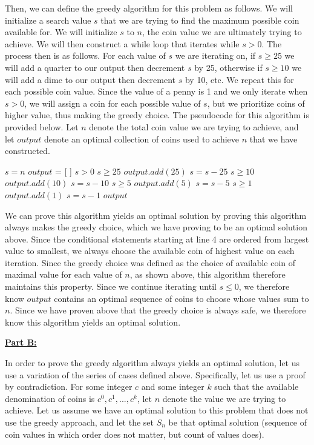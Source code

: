 \documentclass[11pt]{article}
\begin{document}
Then, we can define the greedy algorithm for this problem as follows. We will initialize a search value $s$ that we are trying to find the maximum possible coin available for. We will initialize $s$ to $n$, the coin value we are ultimately trying to achieve. We will then construct a while loop that iterates while $s>0$. The process then is as follows. For each value of $s$ we are iterating on, if $s \geq 25$ we will add a quarter to our output then decrement $s$ by 25, otherwise if $s \geq 10$ we will add a dime to our output then decrement $s$ by 10, etc. We repeat this for each possible coin value. Since the value of a penny is 1 and we only iterate when $s > 0$, we will assign a coin for each possible value of $s$, but we prioritize coins of higher value, thus making the greedy choice. The pseudocode for this algorithm is provided below. Let $n$ denote the total coin value we are trying to achieve, and let $output$ denote an optimal collection of coins used to achieve $n$ that we have constructed.

\begin{codebox}
\li $s = n$
\li $output$ = [ ]
\li \While $s > 0$ \Do
\li     \If $s \geq 25$ \Then
\li         $output.add(25)$
\li         $s = s - 25$
\li     \ElseIf $s \geq 10$ \Then
\li         $output.add(10)$
\li         $s = s - 10$
\li     \ElseIf $s \geq 5$ \Then
\li         $output.add(5)$
\li         $s = s - 5$
\li     \ElseIf $s \geq 1$ \Then
\li         $output.add(1)$
\li         $s = s - 1$
        \End
\li \End
\li \Return $output$
\end{codebox}

We can prove this algorithm yields an optimal solution by proving this algorithm always makes the greedy choice, which we have proving to be an optimal solution above. Since the conditional statements starting at line 4 are ordered from largest value to smallest, we always choose the available coin of highest value on each iteration. Since the greedy choice was defined as the choice of available coin of maximal value for each value of $n$, as shown above, this algorithm therefore maintains this property. Since we continue iterating until $s \leq 0$, we therefore know $output$ contains an optimal sequence of coins to choose whose values sum to $n$. Since we have proven above that the greedy choice is always safe, we therefore know this algorithm yields an optimal solution.

\underline{\textbf{Part B:}}

In order to prove the greedy algorithm always yields an optimal solution, let us use a variation of the series of cases defined above. Specifically, let us use a proof by contradiction. For some integer $c$ and some integer $k$ such that the available denomination of coins is $c^0, c^1, ..., c^k$, let $n$ denote the value we are trying to achieve. Let us assume we have an optimal solution to this problem that does not use the greedy approach, and let the set $S_n$ be that optimal solution (sequence of coin values in which order does not matter, but count of values does).
\end{document}
